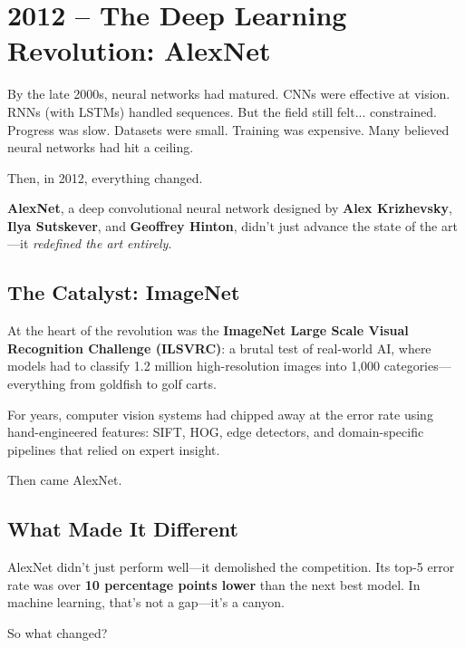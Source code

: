\section{2012 – The Deep Learning Revolution: AlexNet}

By the late 2000s, neural networks had matured.  
CNNs were effective at vision.  
RNNs (with LSTMs) handled sequences.  
But the field still felt... constrained.  
Progress was slow. Datasets were small. Training was expensive.  
Many believed neural networks had hit a ceiling.

Then, in 2012, everything changed.

\textbf{AlexNet}, a deep convolutional neural network designed by \textbf{Alex Krizhevsky}, \textbf{Ilya Sutskever}, and \textbf{Geoffrey Hinton}, didn’t just advance the state of the art—it \emph{redefined the art entirely}.

\subsection{The Catalyst: ImageNet}

At the heart of the revolution was the \textbf{ImageNet Large Scale Visual Recognition Challenge (ILSVRC)}: a brutal test of real-world AI, where models had to classify 1.2 million high-resolution images into 1,000 categories—everything from goldfish to golf carts.

For years, computer vision systems had chipped away at the error rate using hand-engineered features: SIFT, HOG, edge detectors, and domain-specific pipelines that relied on expert insight.

Then came AlexNet.

\subsection{What Made It Different}

AlexNet didn’t just perform well—it demolished the competition.  
Its top-5 error rate was over \textbf{10 percentage points lower} than the next best model. In machine learning, that’s not a gap—it’s a canyon.

So what changed?

